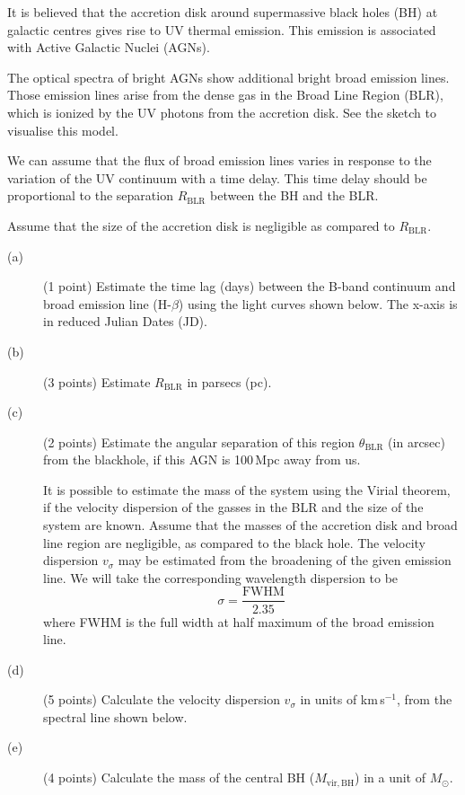It is believed that the accretion disk around supermassive black holes (BH) at
galactic centres gives rise to UV thermal emission. This emission is
associated with Active Galactic Nuclei (AGNs).

The optical spectra of bright AGNs show additional bright broad emission
lines. Those emission lines arise from the dense gas in the Broad Line Region
(BLR), which is ionized by the UV photons from the accretion disk. See the
sketch to visualise this model.


We can assume that the flux of broad emission lines varies in response to the
variation of the UV continuum with a time delay. This time delay should be
proportional to the separation $R_{\mathrm{BLR}}$ between the BH and the BLR.

Assume that the size of the accretion disk is negligible as compared to
$R_{\mathrm{BLR}}$.

\begin{description}
\item[(a)] (1 point) Estimate the time lag (days) between the B-band continuum
  and broad emission line (H-$\beta$) using the light curves shown below. The
  x-axis is in reduced Julian Dates (JD).

\item[(b)] (3 points) Estimate $R_{\mathrm{BLR}}$ in parsecs (pc).
\item[(c)] (2 points) Estimate the angular separation of this region
  $\theta_{\mathrm{BLR}}$ (in arcsec) from the blackhole, if this AGN is
  100\,Mpc away from us.

  It is possible to estimate the mass of the system using the Virial theorem,
  if the velocity dispersion of the gasses in the BLR and the size of the
  system are known. Assume that the masses of the accretion disk and broad
  line region are negligible, as compared to the black hole. The velocity
  dispersion $v_\sigma$ may be estimated from the broadening of the given
  emission line. We will take the corresponding wavelength dispersion to be
  \[ \sigma = \frac{\mathrm{FWHM}}{2.35} \]
  where FWHM is the full width at half maximum of the broad emission line.
\item[(d)] (5 points) Calculate the velocity dispersion $v_\sigma$ in units of
  km\,s$^{-1}$, from the spectral line shown below.

\item[(e)] (4 points) Calculate the mass of the central BH
  ($M_{\mathrm{vir,BH}}$) in a unit of $M_\odot$.
\end{description}
